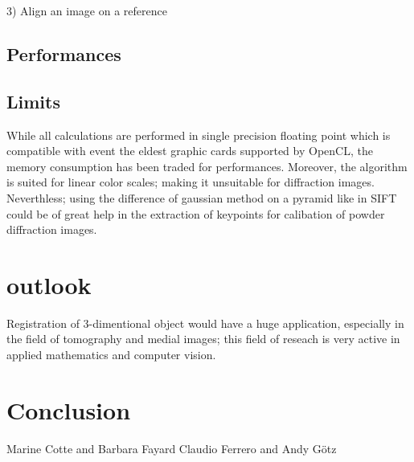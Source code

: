 \documentclass[preprint]{iucr}
\begin{document}
3) Align an image on a reference

   

\subsection{Performances}

\subsection{Limits}
While all calculations are performed in single precision floating point which is
compatible with event the eldest graphic cards supported by OpenCL, the memory
consumption has been traded for performances. Moreover, the algorithm is suited
for linear color scales; making it unsuitable for diffraction images.
Neverthless; using the difference of gaussian method on a pyramid like in
SIFT could be of great help in the extraction of keypoints for calibation of
powder diffraction images.


\section{outlook}

Registration of 3-dimentional object would have a huge application, especially
in the field of tomography and medial images; this field of reseach is very
active in applied mathematics and computer vision.


\section{Conclusion}


Marine Cotte and Barbara Fayard
Claudio Ferrero and Andy G\"otz



\end{document}
